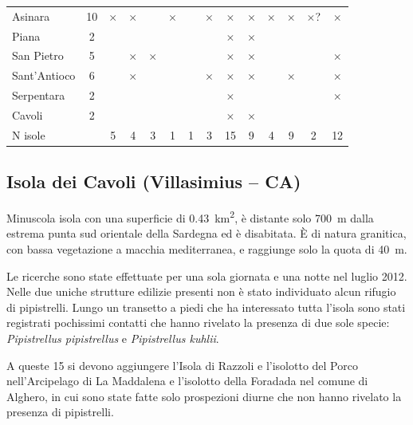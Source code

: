 \begin{multicols}{2}
\begin{compactdesc}
\begin{table}[t]
\begin{tabular}{lccccccccccccc}
Asinara       & 10 & $\times$ & $\times$ &          & $\times$ &          & $\times$ & $\times$ & $\times$ & $\times$  & $\times$ & $\times$? & $\times$ \\
Piana         &  2 &          &          &          &          &          &          & $\times$ & $\times$ &           &          &           &          \\
San Pietro    &  5 &          & $\times$ & $\times$ &          &          &          & $\times$ & $\times$ &           &          &           & $\times$ \\
Sant’Antioco  &  6 &          & $\times$ &          &          &          & $\times$ & $\times$ & $\times$ &           & $\times$ &           & $\times$ \\
Serpentara    &  2 &          &          &          &          &          &          & $\times$ &          &           &          &           & $\times$ \\
Cavoli        &  2 &          &          &          &          &          &          & $\times$ & $\times$ &           &          &           &          \\
N\degree{} isole &    &        5 &        4 &        3 &        1 &        1 &        3 &       15 &        9 &         4 &        9 &         2 &       12 \\
\end{tabular}
\end{table}

\subsection*{Isola dei Cavoli (Villasimius – CA)}
Minuscola isola con una superficie di \SI{0.43}{\square\kilo\meter}, è distante solo 700~m dalla estrema punta sud orientale della Sardegna ed è disabitata. È di natura granitica, con bassa vegetazione a macchia mediterranea, e raggiunge solo la quota di 40~m.
 
Le ricerche sono state effettuate per una sola giornata e una notte nel luglio 2012. Nelle due uniche strutture edilizie presenti non è stato individuato alcun rifugio di pipistrelli.
Lungo un transetto a piedi che ha interessato tutta l’isola sono stati registrati pochissimi contatti che hanno rivelato la presenza di due sole specie: \emph{Pipistrellus pipistrellus} e \emph{Pipistrellus kuhlii}.

A queste 15 si devono aggiungere l’Isola di Razzoli e l’isolotto del Porco nell’Arcipelago di La Maddalena e l’isolotto della Foradada nel comune di Alghero, in cui sono state fatte solo prospezioni diurne che non hanno rivelato la presenza di pipistrelli.


\end{compactdesc}
\end{multicols}
